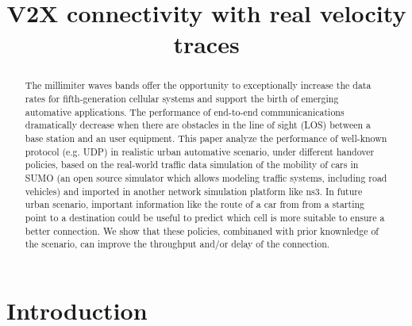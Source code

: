 \documentclass[conference,10pt]{IEEEtran}
\begin{document}
\title{V2X connectivity with real velocity traces}

\author{
}

\maketitle

\begin{abstract}
The millimiter waves bands offer the opportunity to exceptionally increase the data rates for fifth-generation cellular systems and support the birth of emerging automative applications. The performance of end-to-end communicanications dramatically decrease when there are obstacles in the line of sight (LOS) between a base station and an user equipment.
This paper analyze the performance of well-known protocol (e.g. UDP) in realistic urban automative scenario, under different handover policies, based on the real-world traffic data simulation of the mobility of cars in SUMO (an open source simulator which allows modeling traffic systems, including road vehicles) and imported in another network simulation platform like ns3. In future urban scenario, important information like the route of a car from from a starting point to a destination could be useful to predict which cell is more suitable to ensure a better connection. We show that these policies, combinaned with prior knownledge of the scenario, can improve the throughput and/or delay of the connection.
\end{abstract}

\section{Introduction}\label{sec:intro}
\end{document}
